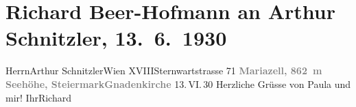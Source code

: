

         
         \renewcommand{\erwaehntePersonen}{Personen: Paula Beer-Hofmann}
         \renewcommand{\erwaehnteOrte}{Orte: Basilika Mariä Geburt, Mariazell, Steiermark, Sternwartestraße, Wien, XVIII., Währing}
         \renewcommand{\erwaehnteWerke}{}
               \section[Richard Beer-Hofmann an Arthur Schnitzler, 13. 6. 1930]{ Richard Beer-Hofmann an Arthur Schnitzler, 13. 6. 1930}\nopagebreak{}\rehead{ }\begin{ledgroupsized}[t]{13cm}\normalsize\beginnumbering \toendnotes[C]{\smallbreak\pagebreak[2]} 
\pstart{}{\pb}Herrn\pend{}\pstart{}Arthur Schnitzler\pend{}\pstart{}Wien XVIII\pend{}\pstart{}Sternwartstrasse 71\pend{}{\bigskip}\pstart
           \noindent{}\centering{}{\pb}\textcolor{gray}{\textbf{Mariazell, 862 m Seehöhe, Steiermark\hspace*{1.5em}Gnadenkirche}}\pend
           \pstart
           \raggedleft{}{\pb}13. VI. 30\pend
           \pstart
           Herzliche Grüsse von Paula und mir!\pend
           \pstart Ihr\spacefill\mbox{Richard}\pend{}
         
         \endnumbering{}\end{ledgroupsized}  \newcommand{\dateiname}{L02537}\newcommand{\titel}{Richard Beer-Hofmann an Arthur Schnitzler, 13. 6. 1930}\newcommand{\editorInnen}{Martin Anton Müller und Gerd-Hermann Susen}
      